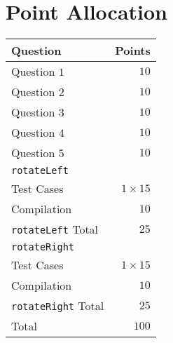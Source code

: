 \documentclass[addpoints,letter,11pt]{exam}
\begin{document}
\section*{Point Allocation}
\begin{table}[H]
  \center
  \begin{tabular}{|l|r|}
    \hline
    Question & Points\\
    \hline
    \hline
    Question $1$ & $10$\\
    Question $2$ & $10$\\
    Question $3$ & $10$\\
    Question $4$ & $10$\\
    Question $5$ & $10$\\
    \hline
    \verb+rotateLeft+ & \\
    Test Cases & $1\times 15$\\
    Compilation & $10$\\
    \verb+rotateLeft+ Total & $25$\\
    \verb+rotateRight+ & \\
    Test Cases & $1\times 15$\\
    Compilation & $10$\\
    \verb+rotateRight+ Total & $25$\\
    \hline
    \hline
    Total & $100$\\
    \hline
  \end{tabular}
\end{table}
\end{document}

